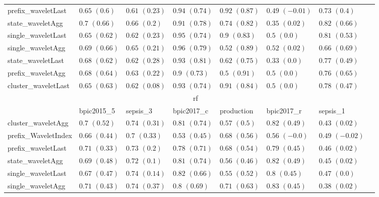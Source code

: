 \documentclass[twoside,11pt]{Latex/Classes/PhDthesisPSnPDF}
\begin{document}
\begin{table}[h]
{\begin{tabular}{llllllll}
				prefix\_waveletLast & $0.65$ ${(0.6)}$ & $0.61$ ${(0.23)}$ & $0.94$ ${(0.74)}$ & $0.92$ ${(0.87)}$ & $0.49$ ${(-0.01)}$ & $0.73$ ${(0.4)}$ \\
				state\_waveletAgg & $0.7$ ${(0.66)}$ & $0.66$ ${(0.2)}$ & $0.91$ ${(0.78)}$ & $0.74$ ${(0.82)}$ & $0.35$ ${(0.02)}$ & $0.82$ ${(0.66)}$ \\
				single\_waveletLast & $0.65$ ${(0.62)}$ & $0.62$ ${(0.23)}$ & $0.95$ ${(0.74)}$ & $0.9$ ${(0.83)}$ & $0.5$ ${(0.0)}$ & $0.81$ ${(0.53)}$ \\
				single\_waveletAgg & $0.69$ ${(0.66)}$ & $0.65$ ${(0.21)}$ & $0.96$ ${(0.79)}$ & $0.52$ ${(0.89)}$ & $0.52$ ${(0.02)}$ & $0.66$ ${(0.69)}$ \\
				state\_waveletLast & $0.68$ ${(0.62)}$ & $0.62$ ${(0.28)}$ & $0.93$ ${(0.81)}$ & $0.62$ ${(0.75)}$ & $0.33$ ${(0.0)}$ & $0.77$ ${(0.49)}$ \\
				prefix\_waveletAgg & $0.68$ ${(0.64)}$ & $0.63$ ${(0.22)}$ & $0.9$ ${(0.73)}$ & $0.5$ ${(0.91)}$ & $0.5$ ${(0.0)}$ & $0.76$ ${(0.65)}$ \\
				cluster\_waveletLast & $0.65$ ${(0.63)}$ & $0.62$ ${(0.08)}$ & $0.93$ ${(0.74)}$ & $0.91$ ${(0.84)}$ & $0.5$ ${(0.0)}$ & $0.78$ ${(0.47)}$ \\
				\bottomrule
				\toprule
				& \multicolumn{5}{c}{rf}
				\\
				& bpic2015\_5 & sepsis\_3 & bpic2017\_c & production & bpic2017\_r & sepsis\_1
				\\ \midrule
				cluster\_waveletAgg & $0.7$ ${(0.52)}$ & $0.74$ ${(0.31)}$ & $0.81$ ${(0.74)}$ & $0.57$ ${(0.5)}$ & $0.82$ ${(0.49)}$ & $0.43$ ${(0.02)}$ \\
				prefix\_WaveletIndex & $0.66$ ${(0.44)}$ & $0.7$ ${(0.33)}$ & $0.53$ ${(0.45)}$ & $0.68$ ${(0.56)}$ & $0.56$ ${(-0.0)}$ & $0.49$ ${(-0.02)}$ \\
				prefix\_waveletLast & $0.71$ ${(0.33)}$ & $0.73$ ${(0.2)}$ & $0.78$ ${(0.71)}$ & $0.68$ ${(0.54)}$ & $0.79$ ${(0.45)}$ & $0.46$ ${(0.02)}$ \\
				state\_waveletAgg & $0.69$ ${(0.48)}$ & $0.72$ ${(0.1)}$ & $0.81$ ${(0.74)}$ & $0.56$ ${(0.46)}$ & $0.82$ ${(0.49)}$ & $0.45$ ${(0.02)}$ \\
				single\_waveletLast & $0.67$ ${(0.47)}$ & $0.74$ ${(0.14)}$ & $0.82$ ${(0.66)}$ & $0.55$ ${(0.52)}$ & $0.8$ ${(0.45)}$ & $0.47$ ${(0.0)}$ \\
				single\_waveletAgg & $0.71$ ${(0.43)}$ & $0.74$ ${(0.37)}$ & $0.8$ ${(0.69)}$ & $0.71$ ${(0.63)}$ & $0.83$ ${(0.45)}$ & $0.38$ ${(0.02)}$ \\

\end{tabular}}
\end{table}
\end{document}

